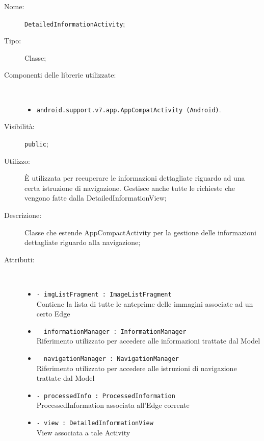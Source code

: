 \documentclass[../DefinizioneDiProdotto.tex]{subfiles}
\begin{document}
\begin{description}
	\item[Nome:] \texttt{DetailedInformationActivity};
	\item[Tipo:] Classe;
	\item[Componenti delle librerie utilizzate:] \
	\begin{itemize}
		\item \texttt{android.support.v7.app.AppCompatActivity (Android)}.
		
	\end{itemize}
	\item[Visibilità:] \texttt{public};
	\item[Utilizzo:] È utilizzata per recuperare le informazioni dettagliate riguardo ad una certa istruzione di navigazione. Gestisce anche tutte le richieste che vengono fatte dalla DetailedInformationView;
	\item[Descrizione:] Classe che estende AppCompactActivity per la gestione delle informazioni dettagliate riguardo alla navigazione;
	\item[Attributi:] \
	\begin{itemize}
		\item \texttt{- imgListFragment : ImageListFragment}\\
		Contiene la lista di tutte le anteprime delle immagini associate ad un certo Edge
		
		\item \texttt{~ informationManager : InformationManager}\\
		Riferimento utilizzato per accedere alle informazioni trattate dal Model
		
		\item \texttt{~ navigationManager : NavigationManager}\\
		Riferimento utilizzato per accedere alle istruzioni di navigazione trattate dal Model
		
		\item \texttt{- processedInfo : ProcessedInformation}\\
		ProcessedInformation associata all'Edge corrente
		
		\item \texttt{- view : DetailedInformationView}\\
		View associata a tale Activity
		

\end{itemize}
\end{description}
\end{document}
